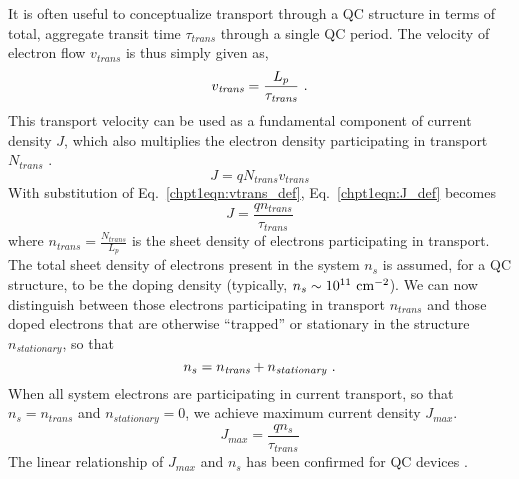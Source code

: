 \documentclass[12pt]{report}
\begin{document}
It is often useful to conceptualize transport through a QC structure in terms of total, aggregate transit time $\tau_\textit{trans}$ through a single QC period.  The velocity of electron flow $v_\textit{trans}$ is thus simply given as,
\begin{equation}
\label{chpt1eqn:vtrans_def}
v_\textit{trans}=\frac{L_p}{\tau_\textit{trans}} \textnormal{~.}
\end{equation} 
This transport velocity can be used as a fundamental component of current density $J$, which also multiplies the electron density participating in transport $N_\textit{trans}$  \cite{Sze}.
\begin{equation}
\label{chpt1eqn:J_def}
J = q N_\textit{trans} v_\textit{trans}
\end{equation}
With substitution of Eq.~\eqref{chpt1eqn:vtrans_def}, Eq.~\eqref{chpt1eqn:J_def} becomes
\begin{equation}
J = \frac{q n_\textit{trans}}{\tau_\textit{trans}}
\end{equation}
where $n_\textit{trans} = \frac{N_\textit{trans}}{L_p}$  is the sheet density of electrons participating in transport.  The total sheet density of electrons present in the system $n_s$ is assumed, for a QC structure, to be the doping density (typically, $n_s\sim10^{11}~\textnormal{cm}^{-2}$).  We can now distinguish between those electrons participating in transport $n_\textit{trans}$ and those doped electrons that are otherwise ``trapped'' or stationary in the structure $n_\textit{stationary}$, so that
\begin{equation}
n_s = n_\textit{trans}+n_\textit{stationary} \textnormal{~.}
\end{equation}
When all system electrons are participating in current transport, so that $n_s=n_\textit{trans}$ and $n_\textit{stationary}=0$, we achieve maximum current density $J_{max}$.
\begin{equation}
J_{max}=\frac{q n_s}{\tau_\textit{trans}}
\end{equation}
The linear relationship of $J_{max}$ and $n_s$ has been confirmed for QC devices \cite{Aellen:JAP:2006} \cite{Howard:APL:2008}.
\end{document}
